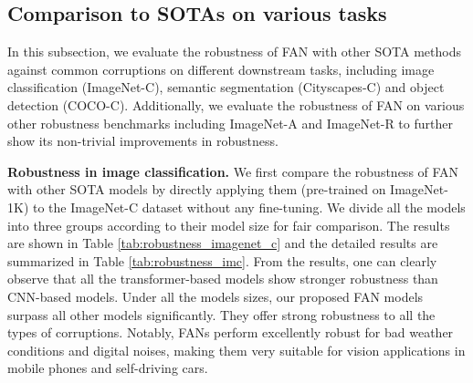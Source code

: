 \documentclass[nohyperref]{article}
\theoremstyle{plain}
\theoremstyle{definition}
\theoremstyle{remark}
\begin{document}
\subsection{Comparison to SOTAs on various tasks}
In this subsection, we evaluate the robustness of FAN with other SOTA methods against common corruptions on different downstream tasks, including image classification (ImageNet-C), semantic segmentation (Cityscapes-C) and object detection (COCO-C). Additionally, we evaluate the robustness of FAN on various other robustness benchmarks including ImageNet-A and ImageNet-R to further show its non-trivial improvements in robustness.

\textbf{Robustness in image classification.}
We first compare the robustness of FAN with other SOTA models   by directly applying them (pre-trained on ImageNet-1K) to the ImageNet-C dataset \cite{hendrycks2019benchmarking} without any fine-tuning. We divide all the models into three groups according to their model size for fair comparison.  The results are shown in Table \ref{tab:robustness_imagenet_c} and the detailed results are summarized in Table \ref{tab:robustness_imc}. From the results, one can clearly observe that all the transformer-based models show stronger robustness than   CNN-based models. Under all the models sizes, our proposed FAN models surpass all other models significantly. They offer strong robustness to all the types of corruptions. Notably, FANs perform excellently robust for bad weather conditions and digital noises, making   them very suitable for vision applications in mobile phones and self-driving cars. 
\end{document}
